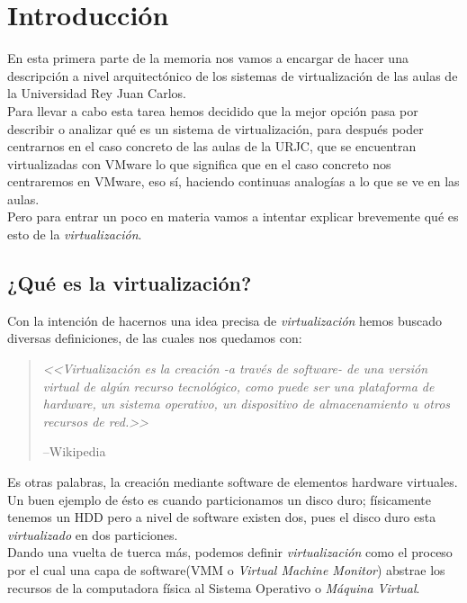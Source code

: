 \chapter{Introducción}
\lettrine[lines=1,slope=4pt,findent=0pt]{E}{}n esta primera parte de la memoria nos vamos a encargar de hacer una descripción a nivel arquitectónico de los sistemas de virtualización de las aulas de la Universidad Rey Juan Carlos.\\

\noindent Para llevar a cabo esta tarea hemos decidido que la mejor opción pasa por describir o analizar qué es un sistema de virtualización, para después poder centrarnos en el caso concreto de las aulas de la URJC, que se encuentran virtualizadas con VMware\cite{vmware} lo que significa que en el caso concreto nos centraremos en VMware, eso sí, haciendo continuas analogías a lo que se ve en las aulas.\\

\noindent Pero para entrar un poco en materia vamos a intentar explicar brevemente qué es esto de la \emph{virtualización}.

\section{¿Qué es la virtualización?}
\noindent Con la intención de hacernos una idea precisa de \emph{virtualización} hemos buscado diversas definiciones, de las cuales nos quedamos con:
\begin{quote}
\emph{<<Virtualización es la creación -a través de software- de una versión virtual de algún recurso tecnológico, como puede ser una plataforma de hardware, un sistema operativo, un dispositivo de almacenamiento u otros recursos de red.>>}
\begin{flushright}
--Wikipedia\cite{defvirwiki}
\end{flushright}
\end{quote}

\noindent Es otras palabras, la creación mediante software de elementos hardware virtuales. Un buen ejemplo de ésto es cuando particionamos un disco duro; físicamente tenemos un HDD pero a nivel de software existen dos, pues el disco duro esta \emph{virtualizado} en dos particiones.\\

\noindent Dando una vuelta de tuerca más, podemos definir \emph{virtualización} como el proceso por el cual una capa de software(VMM o \emph{Virtual Machine Monitor}) abstrae los recursos de la computadora física al Sistema Operativo o \emph{Máquina Virtual}.

